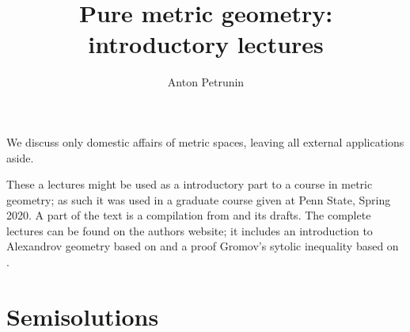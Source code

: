 \documentclass[twoside]{book}
\begin{document}
 
\title{Pure metric geometry:\\
introductory lectures}
\author{Anton Petrunin}
\date{}
\maketitle

We discuss only domestic affairs of metric spaces, leaving all  	external applications aside.

These a lectures might be used as a introductory part to a course in metric geometry;
as such it was used in a graduate course given at Penn State, Spring 2020.
A part of the text is a compilation from \cite{alexander-kapovitch-petrunin-2019, alexander-kapovitch-petrunin-2025, petrunin-yashinski, petrunin-2009, petrunin-zamorabarrera} and its drafts.
The complete lectures can be found on the authors website;
it includes an introduction to Alexandrov geometry based on \cite{alexander-kapovitch-petrunin-2019} and a proof Gromov's sytolic inequality based on \cite{nabutovsky}.

\thispagestyle{empty}
\tableofcontents
\thispagestyle{empty}





%


\appendix
\chapter{Semisolutions}






{\small\sloppy


\printbibliography[heading=bibintoc]
\fussy
}
\end{document}

